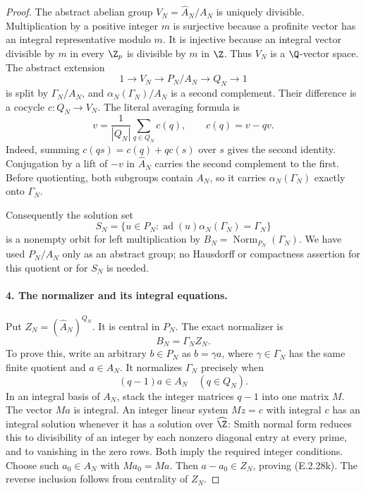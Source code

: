 \begin{proof}
The abstract abelian group
\(V_N=\widehat A_N/A_N\) is uniquely divisible.
Multiplication by a positive integer \(m\) is surjective
because a profinite vector has an integral representative
modulo \(m\). It is injective because an integral vector
divisible by \(m\) in every \(\Z_p\) is divisible by \(m\)
in \(\Z\). Thus \(V_N\) is a \(\Q\)-vector space.
The abstract extension
\[
 1\longrightarrow V_N\longrightarrow P_N/A_N
        \longrightarrow Q_N\longrightarrow1
 \tag{E.2.28h}
\]
is split by \(\Gamma_N/A_N\), and
\(\alpha_N(\Gamma_N)/A_N\) is a second complement.
Their difference is a cocycle \(c:Q_N\to V_N\).
The literal averaging formula is
\[
 v=\frac1{|Q_N|}\sum_{q\in Q_N}c(q),\qquad
 c(q)=v-qv.
 \tag{E.2.28i}
\]
Indeed, summing \(c(qs)=c(q)+qc(s)\) over \(s\)
gives the second identity. Conjugation by a lift of
\(-v\) in \(\widehat A_N\) carries the second complement
to the first. Before quotienting, both subgroups contain
\(A_N\), so it carries
\(\alpha_N(\Gamma_N)\) exactly onto \(\Gamma_N\).

Consequently the solution set
\[
 S_N=\{u\in P_N:
   \operatorname{ad}(u)\alpha_N(\Gamma_N)=\Gamma_N\}
 \tag{E.2.28j}
\]
is a nonempty orbit for left multiplication by
\(B_N=\operatorname{Norm}_{P_N}(\Gamma_N)\).
We have used \(P_N/A_N\) only as an abstract group;
no Hausdorff or compactness assertion for this quotient
or for \(S_N\) is needed.

\paragraph{4. The normalizer and its integral equations.}
Put \(Z_N=(\widehat A_N)^{Q_N}\). It is central in \(P_N\).
The exact normalizer is
\[
 B_N=\Gamma_N Z_N.
 \tag{E.2.28k}
\]
To prove this, write an arbitrary \(b\in P_N\) as
\(b=\gamma a\), where \(\gamma\in\Gamma_N\) has the same
finite quotient and \(a\in\widehat A_N\). It normalizes
\(\Gamma_N\) precisely when
\[
 (q-1)a\in A_N\quad(q\in Q_N).
 \tag{E.2.28l}
\]
In an integral basis of \(A_N\), stack the integer matrices
\(q-1\) into one matrix \(M\). The vector \(Ma\) is integral.
An integer linear system \(Mz=c\) with integral \(c\) has
an integral solution whenever it has a solution over
\(\widehat\Z\): Smith normal form reduces this to divisibility
of an integer by each nonzero diagonal entry at every prime,
and to vanishing in the zero rows. Both imply the required
integer conditions. Choose such \(a_0\in A_N\) with
\(Ma_0=Ma\). Then \(a-a_0\in Z_N\), proving (E.2.28k).
The reverse inclusion follows from centrality of \(Z_N\).


\end{proof}
